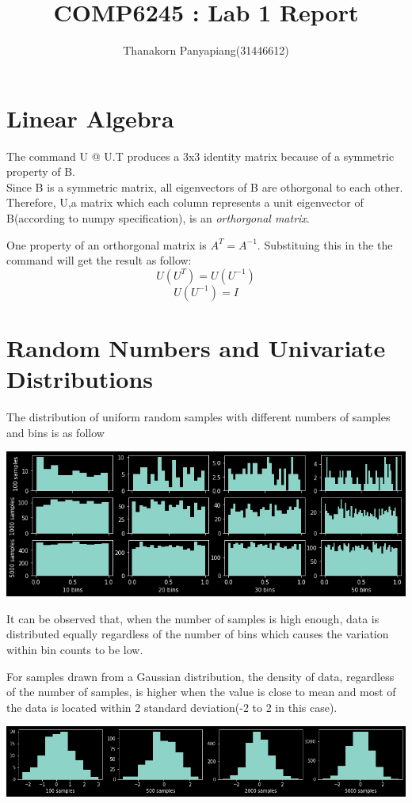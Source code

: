 \documentclass{article}
\title{COMP6245 : Lab 1 Report}
\author{Thanakorn Panyapiang(31446612)}
\begin{document}
\maketitle
\section{Linear Algebra}
The command U @ U.T produces a 3x3 identity matrix because of a symmetric property of B. \\
\indent Since B is a symmetric matrix, all eigenvectors of B are othorgonal to each other. Therefore, U,a matrix which each column represents a unit eigenvector of B(according to numpy specification), is an \textit{orthorgonal matrix}.

One property of an orthorgonal matrix is $A^T = A^{-1}$. Substituing this in the the command will get the result as follow:
\[U(U^T) = U(U^{-1})\]
\[U(U^{-1}) = I \] 

\maketitle
\section{Random Numbers and Univariate Distributions}
The distribution of uniform random samples with different numbers of samples and bins is as follow
\begin{center}
\includegraphics[scale=0.5]{uniform_random_numbers}
\end{center}
It can be observed that, when the number of samples is high enough, data is distributed equally regardless of the number of bins which causes the variation within bin counts to be low.

For samples drawn from a Gaussian distribution, the density of data, regardless of the number of samples, is higher when the value is close to mean and most of the data is located within 2 standard deviation(-2 to 2 in this case).
\begin{center}
\includegraphics[scale=0.4]{gaussian_random_numbers}
\end{center}
\end{document}
